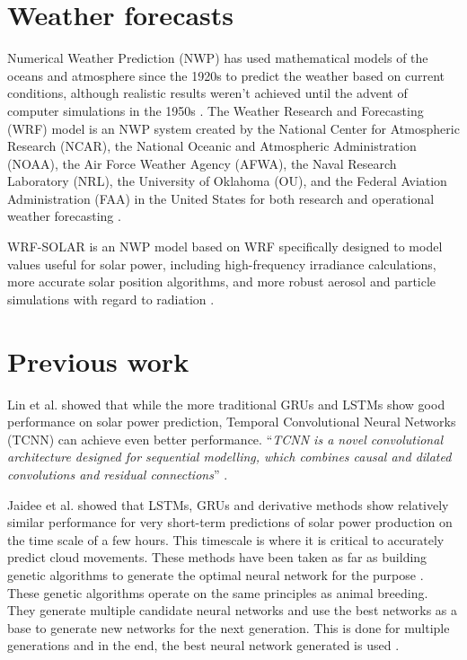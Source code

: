 \section{Weather forecasts\label{cha:WRF}}
Numerical Weather Prediction (NWP) has used mathematical models of the oceans and atmosphere since the 1920s to predict the weather based on current conditions, although realistic results weren't achieved until the advent of computer simulations in the 1950s \cite{noauthor_numerical_2022}. The Weather Research and Forecasting (WRF) model is an NWP system created by the National Center for Atmospheric Research (NCAR), the National Oceanic and Atmospheric Administration (NOAA), the Air Force Weather Agency (AFWA), the Naval Research Laboratory (NRL), the University of Oklahoma (OU), and the Federal Aviation Administration (FAA) in the United States for both research and operational weather forecasting \cite{noauthor_weather_2022}.

WRF-SOLAR is an NWP model based on WRF specifically designed to model values useful for solar power, including high-frequency irradiance calculations, more accurate solar position algorithms, and more robust aerosol and particle simulations with regard to radiation \cite{jimenez_wrf-solar_2016}.
\section{Previous work}
Lin et al. \cite{lin_temporal_2020} showed that while the more traditional GRUs and LSTMs show good performance on solar power prediction, Temporal Convolutional Neural Networks (TCNN) can achieve even better performance. \enquote{\textit{TCNN is a novel convolutional architecture designed for sequential modelling, which combines causal and dilated convolutions
and residual connections}} \cite{lin_temporal_2020}.

Jaidee et al. \cite{jaidee_very_2019} showed that LSTMs, GRUs and derivative methods show relatively similar performance for very short-term predictions of solar power production on the time scale of a few hours. This timescale is where it is critical to accurately predict cloud movements. 
These methods have been taken as far as building genetic algorithms to generate the optimal neural network for the purpose \cite{jaidee_very_2019}. These genetic algorithms operate on the same principles as animal breeding. They generate multiple candidate neural networks and use the best networks as a base to generate new networks for the next generation. This is done for multiple generations and in the end, the best neural network generated is used \cite{jaidee_very_2019}.

